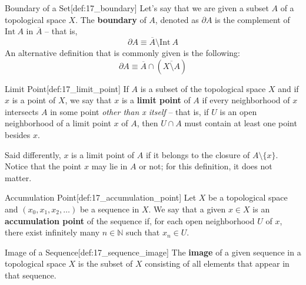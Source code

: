 \begin{defBox}{Boundary of a Set}[def:17_boundary]
    Let's say that we are given a subset \( A \) of a topological space 
    \( X \).
    The \textbf{boundary} of \( A \), denoted as \( \partial A \) is the 
    complement of \( \mathrm{Int} \ A \) in \( \overline{ A } \) -- that is, 
    \begin{equation*}
        \partial A \equiv 
        \overline{ A } \setminus \mathrm{Int} \ A
    \end{equation*}
    An alternative definition that is commonly given is the following:
    \begin{equation*}
        \partial A 
        \equiv 
        \overline{ A } \cap ( \overline{ X \setminus A } )
    \end{equation*}
\end{defBox}

\begin{defBox}{Limit Point}[def:17_limit_point]
    If \( A \) is a subset of the topological space \( X \) and if \( x \) is 
    a point of \( X \), we say that \( x \) is a \textbf{limit point} of 
    \( A \) if every neighborhood of \( x \) intersects \( A \) in some point
    \textit{other than x itself} -- that is, if \( U \) is an open neighborhood
    of a limit point \( x \) of \( A \), then \( U \cap A \) must contain at
    least one point besides \( x \).

    \baseSkip

    Said differently, \( x \) is a limit point of \( A \) if it belongs to the
    closure of \( A \setminus \{ x \} \). Notice that the point \( x \) may lie
    in \( A \) or not; for this definition, it does not matter.
\end{defBox}

\begin{defBox}{Accumulation Point}[def:17_accumulation_point]
    Let \( X \) be a topological space and \( ( x_{ 0 }, x_{ 1 }, x_{ 2 }, 
    \ldots ) \) be a sequence in \( X \).
    We say that a given \( x \in X \) is an \textbf{accumulation point} of the 
    sequence if, for each open neighborhood \( U \) of \( x \), there exist 
    infinitely many \( n \in \mathbb{N} \) such that \( x_{ n } \in U \).
\end{defBox}

\begin{defBox}{Image of a Sequence}[def:17_sequence_image]
    The \textbf{image} of a given sequence in a topological space \( X \) is the
    subset of \( X \) consisting of all elements that appear in that sequence.
\end{defBox}

